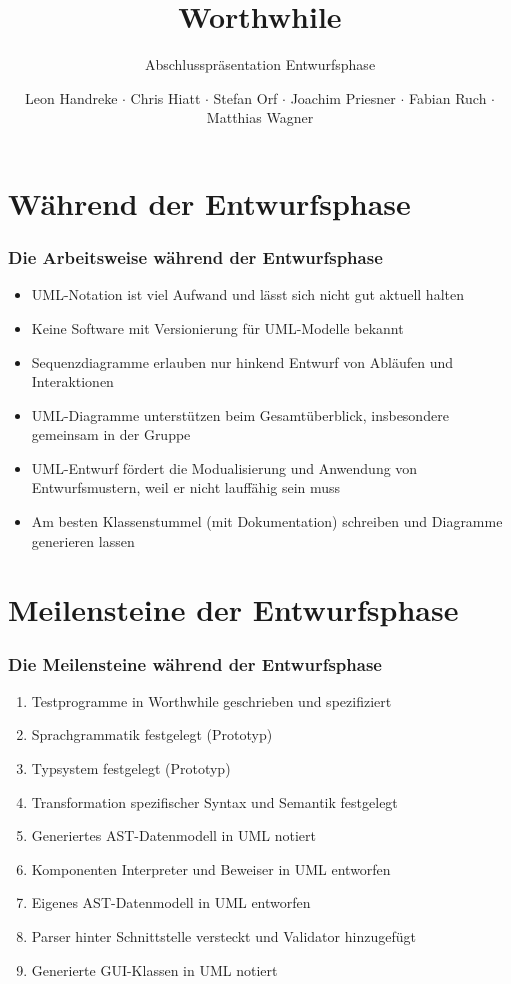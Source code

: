 \documentclass[t]{beamer}
\title{Worthwhile}
\subtitle{Abschlusspräsentation Entwurfsphase}
\author{Leon Handreke $\cdot$ Chris Hiatt $\cdot$ Stefan Orf $\cdot$ Joachim Priesner $\cdot$ Fabian Ruch $\cdot$ Matthias Wagner}
\institute[ITI]{Institut für Theoretische Informatik}
\begin{document}
\begin{frame}
\maketitle
\end{frame}

\section{Während der Entwurfsphase}

\begin{frame}
\frametitle{Die Arbeitsweise während der Entwurfsphase}

\begin{itemize}
    \item<+-> UML-Notation ist viel Aufwand und lässt sich nicht gut aktuell halten
    \item<+-> Keine Software mit Versionierung für UML-Modelle bekannt
    \item<+-> Sequenzdiagramme erlauben nur hinkend Entwurf von Abläufen und Interaktionen
    \item<+-> UML-Diagramme unterstützen beim Gesamtüberblick, insbesondere gemeinsam in der Gruppe
    \item<+-> UML-Entwurf fördert die Modualisierung und Anwendung von Entwurfsmustern, weil er nicht lauffähig sein muss
    \item<+-> Am besten Klassenstummel (mit Dokumentation) schreiben und Diagramme generieren lassen
\end{itemize}
\end{frame}

\section{Meilensteine der Entwurfsphase}

\begin{frame}
\frametitle{Die Meilensteine während der Entwurfsphase}

\begin{enumerate}
    \item<+-> Testprogramme in Worthwhile geschrieben und spezifiziert
    \item<+-> Sprachgrammatik festgelegt (Prototyp)
    \item<+-> Typsystem festgelegt (Prototyp)
    \item<+-> Transformation spezifischer Syntax und Semantik festgelegt
    \item<+-> Generiertes AST-Datenmodell in UML notiert
    \item<+-> Komponenten Interpreter und Beweiser in UML entworfen
    \item<+-> Eigenes AST-Datenmodell in UML entworfen
    \item<+-> Parser hinter Schnittstelle versteckt und Validator hinzugefügt
    \item<+-> Generierte GUI-Klassen in UML notiert
\end{enumerate}
\end{frame}
\end{document}
